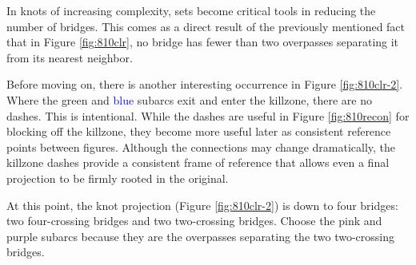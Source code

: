 \documentclass[titlepage]{article}
\begin{document}
In knots of increasing complexity, sets become critical tools in reducing the number of bridges. This comes as a direct result of the previously mentioned fact that in Figure \ref{fig:810clr}, no bridge has fewer than two overpasses separating it from its nearest neighbor.\par
Before moving on, there is another interesting occurrence in Figure \ref{fig:810clr-2}. Where the \textcolor{grx}{green} and \textcolor{blue}{blue} subarcs exit and enter the killzone, there are no dashes. This is intentional. While the dashes are useful in Figure \ref{fig:810recon} for blocking off the killzone, they become more useful later as consistent reference points between figures. Although the connections may change dramatically, the killzone dashes provide a consistent frame of reference that allows even a final projection to be firmly rooted in the original.\par
At this point, the knot projection (Figure \ref{fig:810clr-2}) is down to four bridges: two four-crossing bridges and two two-crossing bridges. Choose the \textcolor{max}{pink} and \textcolor{pux}{purple} subarcs because they are the overpasses separating the two two-crossing bridges.\par
\end{document}
